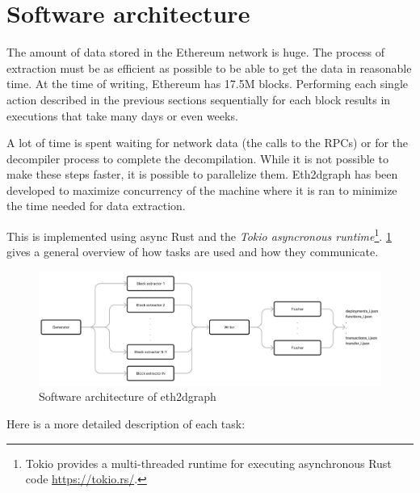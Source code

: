 \section{Software architecture}

The amount of data stored in the Ethereum network is huge. The process of extraction must be as efficient as possible to be able to get the data in reasonable time. At the time of writing, Ethereum has 17.5M blocks. Performing each single action described in the previous sections sequentially for each block results in executions that take many days or even weeks. 

A lot of time is spent waiting for network data (the calls to the RPCs) or for the decompiler process to complete the decompilation. While it is not possible to make these steps faster, it is possible to parallelize them. Eth2dgraph has been developed to maximize concurrency of the machine where it is ran to minimize the time needed for data extraction.

This is implemented using async Rust and the \textit{Tokio asyncronous runtime}\footnote{Tokio provides a multi-threaded runtime for executing asynchronous Rust code \url{https://tokio.rs/}.}. \cref{fig:eth2dgraph-architecture} gives a general overview of how tasks are used and how they communicate.

\begin{figure}[H]
  \centering
  \includegraphics[width=1\textwidth]{Figures/methods/software-architecture.jpg}
  \caption[Software architecture of eth2dgraph]{Software architecture of eth2dgraph}
  \label{fig:eth2dgraph-architecture}
\end{figure}

Here is a more detailed description of each task:

